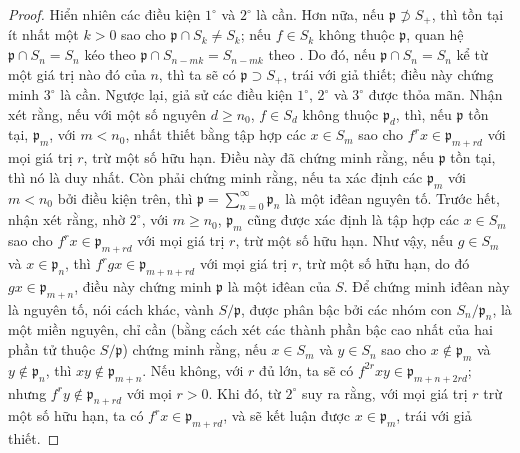 \documentclass[oneside,10pt]{amsart}
\renewcommand{\geq}{\geqslant}
\newcommand{\oldpage}[2][]{\marginnote{\normalfont\footnotesize\textbf{#1}~|~#2}\ignorespaces}
\begin{document}
\begin{proof}
Hiển nhiên các điều kiện $1^\circ$ và $2^\circ$ là cần.
Hơn nữa, nếu $\mathfrak{p}\not\supset S_+$, thì tồn tại ít nhất một $k>0$ sao cho $\mathfrak{p}\cap S_k\neq S_k$; nếu $f\in S_k$ không thuộc $\mathfrak{p}$, quan hệ $\mathfrak{p}\cap S_n=S_n$ kéo theo $\mathfrak{p}\cap S_{n-mk}=S_{n-mk}$ theo .
Do đó, nếu $\mathfrak{p}\cap S_n=S_n$ kể từ một giá trị nào đó của $n$, thì ta sẽ có $\mathfrak{p}\supset S_+$, trái với giả thiết; điều này chứng minh $3^\circ$ là cần.
Ngược lại, giả sử các điều kiện $1^\circ$, $2^\circ$ và $3^\circ$ được thỏa mãn.
Nhận xét rằng, nếu với một số nguyên $d\geq n_0$, $f\in S_d$ không thuộc $\mathfrak{p}_d$, thì, nếu $\mathfrak{p}$ tồn tại, $\mathfrak{p}_m$, với $m<n_0$, nhất thiết bằng tập hợp các $x\in S_m$ sao cho $f^rx\in\mathfrak{p}_{m+rd}$ với mọi giá trị $r$, trừ một số hữu hạn.
Điều này đã chứng minh rằng, nếu $\mathfrak{p}$ tồn tại, thì nó là duy nhất.
Còn phải chứng minh rằng, nếu ta xác định các $\mathfrak{p}_m$ với $m<n_0$ bởi điều kiện trên, thì $\mathfrak{p}=\sum_{n=0}^{\infty}\mathfrak{p}_n$ là một iđêan nguyên tố.
Trước hết, nhận xét rằng, nhờ $2^\circ$, với $m\geq n_0$, $\mathfrak{p}_m$ cũng được xác định là tập hợp các $x\in S_m$ sao cho $f^rx\in\mathfrak{p}_{m+rd}$ với mọi giá trị $r$, trừ một số hữu hạn.
Như
\oldpage[II]{23}
vậy, nếu $g\in S_m$ và $x\in\mathfrak{p}_n$, thì $f^rgx\in\mathfrak{p}_{m+n+rd}$ với mọi giá trị $r$, trừ một số hữu hạn, do đó $gx\in\mathfrak{p}_{m+n}$, điều này chứng minh $\mathfrak{p}$ là một iđêan của $S$.
Để chứng minh iđêan này là nguyên tố, nói cách khác, vành $S/\mathfrak{p}$, được phân bậc bởi các nhóm con $S_n/\mathfrak{p}_n$, là một miền nguyên, chỉ cần (bằng cách xét các thành phần bậc cao nhất của hai phần tử thuộc $S/\mathfrak{p}$) chứng minh rằng, nếu $x\in S_m$ và $y\in S_n$ sao cho $x\notin\mathfrak{p}_m$ và $y\notin\mathfrak{p}_n$, thì $xy\notin\mathfrak{p}_{m+n}$.
Nếu không, với $r$ đủ lớn, ta sẽ có $f^{2r}xy\in\mathfrak{p}_{m+n+2rd}$; nhưng $f^ry\notin\mathfrak{p}_{n+rd}$ với mọi $r>0$.
Khi đó, từ $2^\circ$ suy ra rằng, với mọi giá trị $r$ trừ một số hữu hạn, ta có $f^rx\in\mathfrak{p}_{m+rd}$, và sẽ kết luận được $x\in\mathfrak{p}_m$, trái với giả thiết.
\end{proof}
\end{document}
